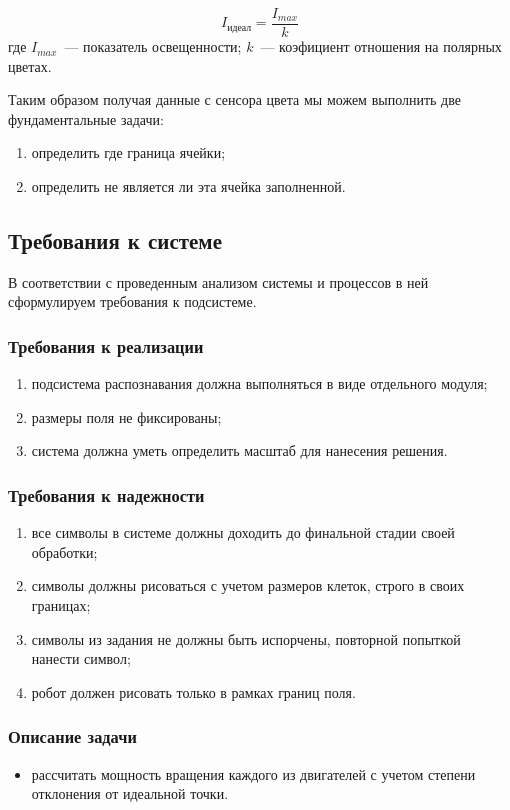 \begin{equation}
\label{f:perfectPoint}
I_\text{идеал}= \frac{I_{max}}{ k }
\end{equation}
где $I_{max}$~--- показатель освещенности; $k$~--- коэфициент отношения на полярных цветах.

Таким образом получая данные с сенсора цвета мы можем выполнить две фундаментальные задачи:
\begin{enumerate}
 \item определить где граница ячейки;
 \item определить не является ли эта ячейка заполненной.
\end{enumerate}


\subsection{Требования к системе}
В соответствии с проведенным анализом системы и процессов в ней сформулируем требования к подсистеме.

\subsubsection*{Требования к реализации}
\begin{enumerate}
 \item подсистема распознавания должна выполняться в виде отдельного модуля;
 \item размеры поля не фиксированы;
 \item система должна уметь определить масштаб для нанесения решения.
\end{enumerate}

\subsubsection*{Требования к надежности}
\begin{enumerate}
 \item все символы в системе должны доходить до финальной стадии своей обработки;
 \item символы должны рисоваться с учетом размеров клеток, строго в своих границах;
 \item символы из задания не должны быть испорчены, повторной попыткой нанести символ;
 \item робот должен рисовать только в рамках границ поля.
\end{enumerate}



\subsubsection*{Описание задачи }
\begin{itemize}
\item рассчитать мощность вращения каждого из двигателей с учетом степени отклонения от идеальной точки.  
\end{itemize}


